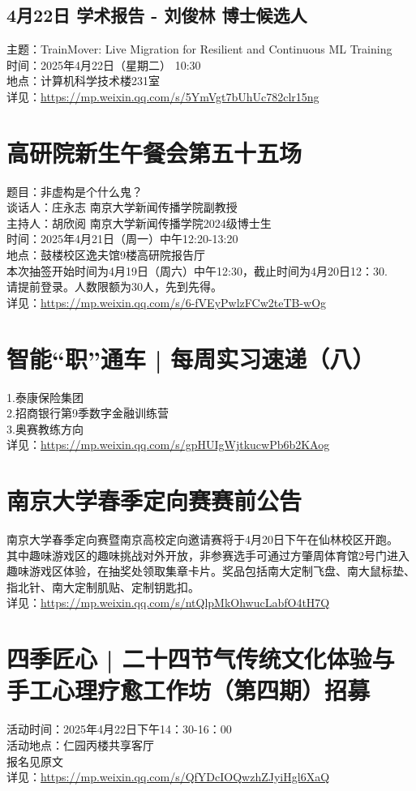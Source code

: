 \documentclass[letterpaper, 12pt]{article}
\begin{document}
\begin{multicols}{2}
\subsection{4月22日 学术报告 - 刘俊林 博士候选人}
主题：TrainMover: Live Migration for Resilient and Continuous ML Training
\\时间：2025年4月22日（星期二） 10:30
\\地点：计算机科学技术楼231室
\\详见：\url{https://mp.weixin.qq.com/s/5YmVgt7bUhUc782clr15ng}
\section{高研院新生午餐会第五十五场}
题目：非虚构是个什么鬼？
\\谈话人：庄永志 南京大学新闻传播学院副教授
\\主持人：胡欣阅 南京大学新闻传播学院2024级博士生
\\时间：2025年4月21日（周一）中午12:20-13:20
\\地点：鼓楼校区逸夫馆9楼高研院报告厅
\\本次抽签开始时间为4月19日（周六）中午12:30，截止时间为4月20日12：30.
\\请提前登录。人数限额为30人，先到先得。
\\详见：\url{https://mp.weixin.qq.com/s/6-fVEyPwlzFCw2teTB-wOg}
\section{智能“职”通车 | 每周实习速递（八）}
1.泰康保险集团
\\2.招商银行第9季数字金融训练营
\\3.奥赛教练方向
\\详见：\url{https://mp.weixin.qq.com/s/gpHUIgWjtkucwPb6b2KAog}

\section{南京大学春季定向赛赛前公告}
南京大学春季定向赛暨南京高校定向邀请赛将于4月20日下午在仙林校区开跑。
\\其中趣味游戏区的趣味挑战对外开放，非参赛选手可通过方肇周体育馆2号门进入趣味游戏区体验，在抽奖处领取集章卡片。奖品包括南大定制飞盘、南大鼠标垫、指北针、南大定制肌贴、定制钥匙扣。
\\详见：\url{https://mp.weixin.qq.com/s/ntQlpMkOhwucLabfO4tH7Q}

\section{四季匠心 | 二十四节气传统文化体验与手工心理疗愈工作坊（第四期）招募}
活动时间：2025年4月22日下午14：30-16：00
\\活动地点：仁园丙楼共享客厅
\\报名见原文
\\详见：\url{https://mp.weixin.qq.com/s/QfYDcIOQwzhZJyiHgl6XaQ}


\end{multicols}
\end{document}
